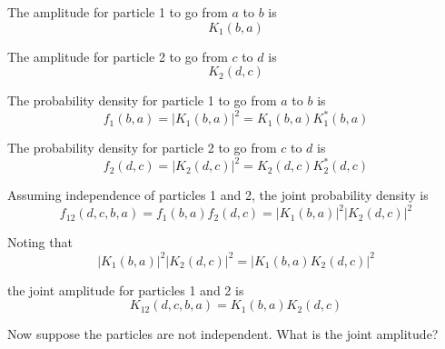 

The amplitude for particle 1 to go from $a$ to $b$ is
\begin{equation*}
K_1(b,a)
\end{equation*}

The amplitude for particle 2 to go from $c$ to $d$ is
\begin{equation*}
K_2(d,c)
\end{equation*}

The probability density for particle 1 to go from $a$ to $b$ is
\begin{equation*}
f_1(b,a)=|K_1(b,a)|^2=K_1(b,a)K_1^*(b,a)
\end{equation*}

The probability density for particle 2 to go from $c$ to $d$ is
\begin{equation*}
f_2(d,c)=|K_2(d,c)|^2=K_2(d,c)K_2^*(d,c)
\end{equation*}

Assuming independence of particles 1 and 2,
the joint probability density is
\begin{equation*}
f_{12}(d,c,b,a)=f_1(b,a)f_2(d,c)=|K_1(b,a)|^2|K_2(d,c)|^2
\end{equation*}

Noting that
\begin{equation*}
|K_1(b,a)|^2|K_2(d,c)|^2=|K_1(b,a)K_2(d,c)|^2
\end{equation*}

the joint amplitude for particles 1 and 2 is
\begin{equation*}
K_{12}(d,c,b,a)=K_1(b,a)K_2(d,c)
\end{equation*}

Now suppose the particles are not independent.
What is the joint amplitude?


